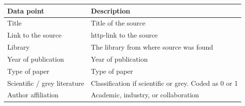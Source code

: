 \documentclass[english, 12pt, a4paper, sci, utf8, a-1b, online]{aaltothesis}
\begin{document}
\begin{table}
  \begin{center}
    \begin{tabular}{ | p{} | p{} | }
      \hline
      \textbf{Data point}                  & \textbf{Description}                                                                                                                                                                                          \\ \hline
      Title                                & Title of the source                                                                                                                                                                                           \\ \hline
      Link to the source                   & http-link to the source                                                                                                                                                                                       \\ \hline
      Library                              & The library from where source was found                                                                                                                                                                       \\ \hline
      Year of publication                  & Year of publication                                                                                                                                                                                           \\ \hline
      Type of paper                        & Type of paper                                                                                                                                                                                                 \\ \hline
      Scientific / grey literature         & Classification if scientific or grey. Coded as 0 or 1                                                                                                                                                         \\ \hline
      Author affiliation                   & Academic, industry, or collaboration                                                                                                                                                                          \\ \hline

\end{tabular}
\end{center}
\end{table}
\end{document}
